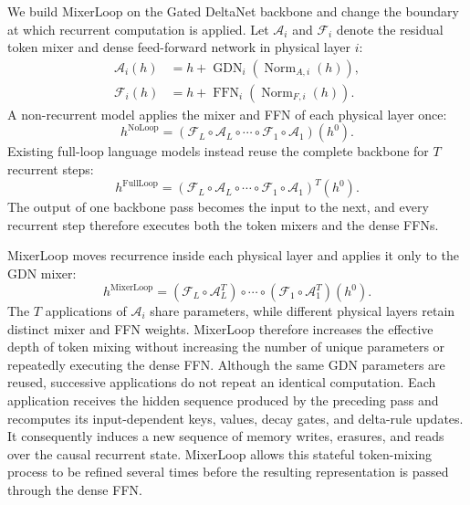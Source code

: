 \documentclass{article}
\newcommand{\Aop}{\mathcal{A}}
\newcommand{\Fop}{\mathcal{F}}
\begin{document}
We build MixerLoop on the Gated DeltaNet backbone and change the
boundary at which recurrent computation is applied. Let $\Aop_i$ and $\Fop_i$
denote the residual token mixer and dense feed-forward network in physical layer
$i$:
\begin{align}
\Aop_i(h)
&=
h+
\operatorname{GDN}_i\!\left(
\operatorname{Norm}_{A,i}(h)
\right),\\
\Fop_i(h)
&=
h+
\operatorname{FFN}_i\!\left(
\operatorname{Norm}_{F,i}(h)
\right).
\end{align}
A non-recurrent model applies the mixer and FFN of each physical layer once:
\begin{equation}
h^{\mathrm{NoLoop}}
=\left(
\Fop_L\circ\Aop_L\circ\cdots\circ
\Fop_1\circ\Aop_1
\right)(h^0).
\label{eq:noloop}
\end{equation}
Existing full-loop language models instead reuse the complete backbone for
$T$ recurrent steps:
\begin{equation}
h^{\mathrm{FullLoop}}
=\left(
\Fop_L\circ\Aop_L\circ\cdots\circ
\Fop_1\circ\Aop_1
\right)^T(h^0).
\label{eq:fullloop}
\end{equation}
The output of one backbone pass becomes the input to the next, and every
recurrent step therefore executes both the token mixers and the dense FFNs.

MixerLoop moves recurrence inside each physical layer and applies it only to
the GDN mixer:
\begin{equation}
h^{\mathrm{MixerLoop}}
=\left(\Fop_L\circ\Aop_L^T\right)\circ\cdots\circ
\left(\Fop_1\circ\Aop_1^T\right)(h^0).
\label{eq:mixerloop}
\end{equation}
The $T$ applications of $\Aop_i$ share parameters, while different physical layers retain distinct mixer and FFN weights. MixerLoop therefore increases the effective depth of token mixing without increasing the number of unique parameters or repeatedly executing the dense FFN. Although the same GDN parameters are reused, successive applications do not repeat an identical computation. Each application receives the hidden sequence produced by the preceding pass and recomputes its input-dependent keys, values, decay gates, and delta-rule updates. It consequently induces a new sequence of memory writes, erasures, and reads over the causal recurrent state. MixerLoop allows this stateful token-mixing process to be refined several times before the resulting representation is passed through the dense FFN.
\end{document}
